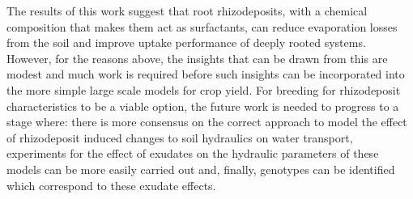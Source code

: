 \documentclass[11pt,a4paper]{article}
\numberwithin{equation}{section}
\begin{document}
The results of this work suggest that root rhizodeposits, with a chemical composition that makes them act as surfactants, can reduce evaporation losses from the soil and improve uptake performance of deeply rooted systems. However, for the reasons above, the insights that can be drawn from this are modest and much work is required before such insights can be incorporated into the more simple large scale models for crop yield.
For breeding for rhizodeposit characteristics to be a viable option, the future work is needed to progress to a stage where: there is more consensus on the correct approach to model the effect of rhizodeposit induced changes to soil hydraulics on water transport, experiments for the effect of exudates on the hydraulic parameters of these models can be more easily carried out and, finally, genotypes can be identified which correspond to these exudate effects. 

 

%



\end{document}
